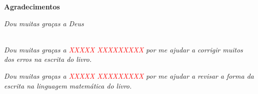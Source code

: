 \cleardoublepage

\begin{center}
\Huge{\textbf{Agradecimentos}}
\end{center}

\null
\vfill
\thispagestyle{empty}

{\normalsize \it \hfill Dou muitas graças a Deus \vspace*{4pt}}


~\\

{\normalsize \it Dou muitas graças a \textcolor{red}{XXXXX XXXXXXXXX} por me 
ajudar a corrigir muitos dos erros na escrita do livro.
\vspace*{4pt}}

{\normalsize \it Dou muitas graças a \textcolor{red}{XXXXX XXXXXXXXX} por me 
ajudar a revisar a forma da escrita na linguagem matemática do livro.
\vspace*{4pt}}

\begin{comment}
{\normalsize \it Dou muitas graças a XXXXX XXXXXXXXX por me 
ajudar a resolver muitas duvidas sobre definições e uso de termos na XXXXXXX XXXXXXX.
\vspace*{4pt}}
\end{comment}

\begin{comment}
{\normalsize \it Dou muitas graças a XXXXX XXXXXXXXX pela 
suas sugestões e revisão  do capitulo XXXXX XXXXXXXXX.
\vspace*{4pt}}
\end{comment}


